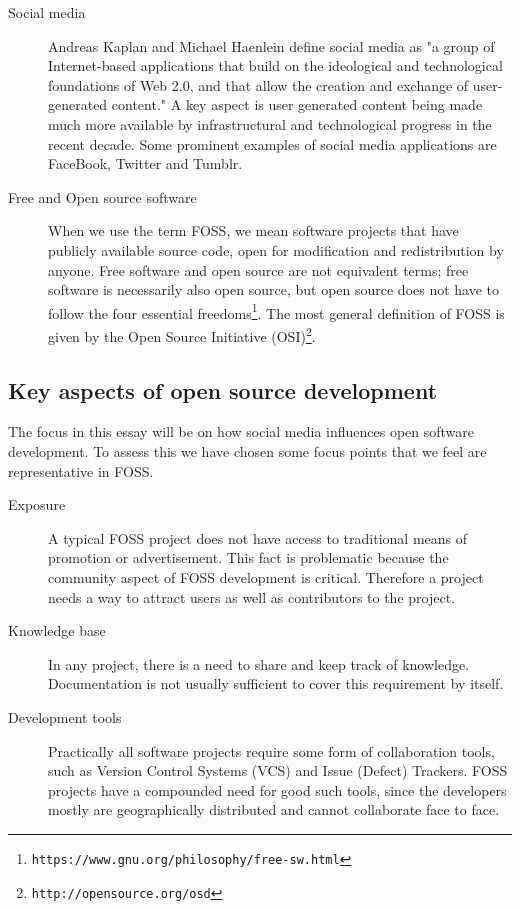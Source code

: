 \documentclass[a4paper,11pt]{article} %
\begin{document}
\begin{description}
\item[Social media] \hfill
  
  Andreas Kaplan and Michael Haenlein define social media as "a group of
  Internet-based applications that build on the ideological and
  technological foundations of Web 2.0, and that allow the creation and
  exchange of user-generated content."\cite{Kaplan201059} A key aspect is
  user generated content being made much more available by infrastructural
  and technological progress in the recent decade. Some prominent examples
  of social media applications are FaceBook, Twitter and Tumblr.

\item[Free and Open source software] \hfill

  When we use the term FOSS, we mean software projects that have publicly
  available source code, open for modification and redistribution by
  anyone\cite[.p~18,p.~57]{leister2014opensource}. Free software and open
  source are not equivalent terms; free software is necessarily also open
  source, but open source does not have to follow the four essential
  freedoms\footnote{\texttt{https://www.gnu.org/philosophy/free-sw.html}}. The
  most general definition of FOSS is given by the Open Source Initiative
  (OSI)\footnote{\texttt{http://opensource.org/osd}}.

\end{description}

\subsection{Key aspects of open source development}

The focus in this essay will be on how social media influences open software
development. To assess this we have chosen some focus points that we feel
are representative in FOSS.

\begin{description}
\item[Exposure] \hfill
  
  A typical FOSS project does not have access to traditional means of
  promotion or advertisement. This fact is problematic because the community
  aspect of FOSS development is critical. Therefore a project needs a way to
  attract users as well as contributors to the project.
\item[Knowledge base] \hfill

  In any project, there is a need to share and keep track of
  knowledge. Documentation is not usually sufficient to cover this
  requirement by itself.
\item[Development tools] \hfill
  
  Practically all software projects require some form of collaboration
  tools, such as Version Control Systems (VCS) and Issue (Defect)
  Trackers. FOSS projects have a compounded need for good such tools, since
  the developers mostly are geographically distributed and cannot
  collaborate face to face.
\end{description}
\end{document}
